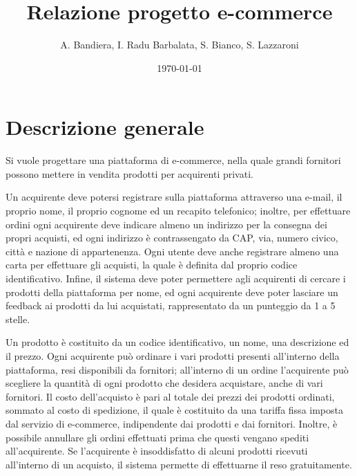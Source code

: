 \documentclass[12pt]{report}
\begin{document}
    \renewcommand{\labelenumii}{\arabic{enumi}.\arabic{enumii}}
    \renewcommand{\labelenumiii}{\arabic{enumi}.\arabic{enumii}.\arabic{enumiii}}
    \renewcommand{\labelenumiv}{\arabic{enumi}.\arabic{enumii}.\arabic{enumiii}.\arabic{enumiv}}

    \title{Relazione progetto e-commerce}
    \author{A. Bandiera, I. Radu Barbalata, S. Bianco, S. Lazzaroni}
    \date{\today}

    \maketitle
    \tableofcontents
    \newpage

    \chapter{Descrizione generale}
    

    Si vuole progettare una piattaforma di e-commerce, nella quale grandi fornitori possono mettere in vendita prodotti per acquirenti privati.

    Un acquirente deve potersi registrare sulla piattaforma attraverso una e-mail, il proprio nome, il proprio cognome ed un recapito telefonico; inoltre, per effettuare ordini ogni acquirente deve indicare almeno un indirizzo per la consegna dei propri acquisti, ed ogni indirizzo è contrassengato da CAP, via, numero civico, città e nazione di appartenenza. Ogni utente deve anche registrare almeno una carta per effettuare gli acquisti, la quale è definita dal proprio codice identificativo. Infine, il sistema deve poter permettere agli acquirenti di cercare i prodotti della piattaforma per nome, ed ogni acquirente deve poter lasciare un feedback ai prodotti da lui acquistati, rappresentato da un punteggio da 1 a 5 stelle.

    Un prodotto è costituito da un codice identificativo, un nome, una descrizione ed il prezzo. Ogni acquirente può ordinare i vari prodotti presenti all'interno della piattaforma, resi disponibili da fornitori; all'interno di un ordine l'acquirente può scegliere la quantità di ogni prodotto che desidera acquistare, anche di vari fornitori. Il costo dell'acquisto è pari al totale dei prezzi dei prodotti ordinati, sommato al costo di spedizione, il quale è costituito da una tariffa fissa imposta dal servizio di e-commerce, indipendente dai prodotti e dai fornitori. Inoltre, è possibile annullare gli ordini effettuati prima che questi vengano spediti all'acquirente. Se l'acquirente è insoddisfatto di alcuni prodotti ricevuti all'interno di un acquisto, il sistema permette di effettuarne il reso gratuitamente.
\end{document}
